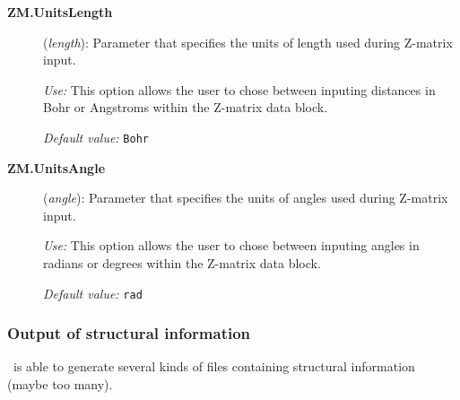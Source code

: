 \begin{description}
\item[\textbf{ZM.UnitsLength}] (\textit{length}):
Parameter that specifies the units of length used during Z-matrix input.

\textit{Use:} This option allows the user to chose between inputing distances
in Bohr or Angstroms within the Z-matrix data block.

\textit{Default value:} \texttt{Bohr}

\item[\textbf{ZM.UnitsAngle}] (\textit{angle}):
Parameter that specifies the units of angles used during Z-matrix input.

\textit{Use:} This option allows the user to chose between inputing angles
in radians or degrees within the Z-matrix data block.

\textit{Default value:} \texttt{rad}

\end{description}



\subsubsection{Output of structural information}

\siesta\ is able to generate several kinds of files containing
structural information (maybe too many).

